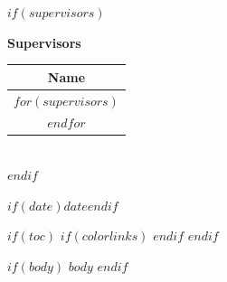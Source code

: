\documentclass[$if(fontsize)$$fontsize$,$endif$$if(lang)$$babel-lang$,$endif$$if(papersize)$$papersize$paper,$endif$$for(classoption)$$classoption$$sep$,$endfor$]{$documentclass$}
\renewcommand{\arraystretch}{1.4}
\begin{document}
\begin{titlepage}
\begin{center}
$if(supervisors)$
\begin{minipage}{\textwidth}
\begin{center}
\large\textbf{Supervisors}\\[0.3cm]

\renewcommand{\arraystretch}{1.8}
\begin{tabular}{@{}c@{}}
\toprule
\multicolumn{1}{c}{\textbf{Name}} \\
\midrule
$for(supervisors)$
\multicolumn{1}{c}{$supervisors$} \\
$endfor$
\bottomrule
\end{tabular}
\end{center}
\end{minipage}\\[0.8cm]
$endif$

$if(date)${\large $date$}$endif$

\end{center}
\end{titlepage}

$if(toc)$
{
$if(colorlinks)$
\hypersetup{linkcolor=$if(toccolor)$$toccolor$$else$accent$endif$}
$endif$
\setcounter{tocdepth}{$toc-depth$}
\tableofcontents
}
$endif$

$if(body)$
$body$
$endif$
\end{document}
